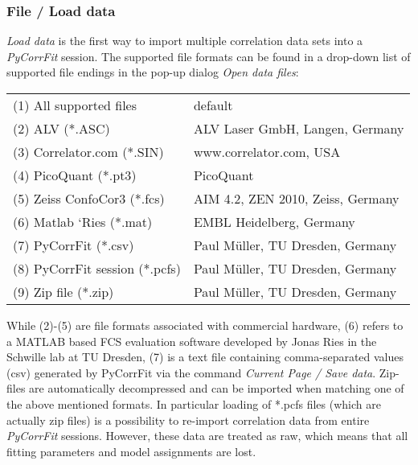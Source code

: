 \subsubsection{File / Load data}
\label{sec:menub.filem.loadd}
\textit{Load data }is the first way to import multiple correlation data sets into a \textit{PyCorrFit} session. The supported file formats can be found in a drop-down list of supported file endings in the pop-up dialog \textit{Open data files}:

\begin{tabular}{l l}
 \rule{0pt}{3ex}  (1) All supported files & default \\

 \rule{0pt}{3ex} (2) ALV (*.ASC) & ALV Laser GmbH, Langen, Germany \\

 \rule{0pt}{3ex} (3) Correlator.com (*.SIN) & www.correlator.com, USA \\
 
 \rule{0pt}{3ex} (4) PicoQuant (*.pt3) & PicoQuant \\

 \rule{0pt}{3ex} (5) Zeiss ConfoCor3 (*.fcs) & AIM 4.2, ZEN 2010, Zeiss, Germany \\
 
 \rule{0pt}{3ex} (6) Matlab ‘Ries (*.mat) & EMBL Heidelberg, Germany \\

 \rule{0pt}{3ex} (7) PyCorrFit (*.csv) & Paul Müller, TU Dresden, Germany \\

 \rule{0pt}{3ex} (8) PyCorrFit session (*.pcfs) & Paul Müller, TU Dresden, Germany \\


 \rule{0pt}{3ex} (9) Zip file (*.zip) & Paul Müller, TU Dresden, Germany \\
\end{tabular}
\vspace{3ex}
\newline
While (2)-(5) are file formats associated with commercial hardware, (6) refers to a MATLAB based FCS evaluation software developed by Jonas Ries in the Schwille lab at TU Dresden, (7) is a text file containing comma-separated values (csv) generated by PyCorrFit via the command \textit{Current Page / Save data}. Zip-files are automatically decompressed and can be imported when matching one of the above mentioned formats. In particular loading of *.pcfs files (which are actually zip files) is a possibility to re-import correlation data from entire \textit{PyCorrFit} sessions. However, these data are treated as raw, which means that all fitting parameters and model assignments are lost.

